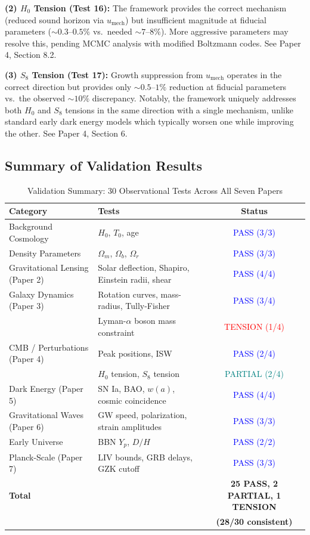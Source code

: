 \documentclass[11pt,a4paper]{article}
\newcommand{\umech}{\ensuremath{u_{\mathrm{mech}}}}
\theoremstyle{definition}
\theoremstyle{remark}
\begin{document}
\textbf{(2) $H_0$ Tension (Test 16):} The framework provides the correct mechanism (reduced sound horizon via $\umech$) but insufficient magnitude at fiducial parameters ($\sim 0.3$--$0.5\%$ vs.\ needed $\sim 7$--$8\%$). More aggressive parameters may resolve this, pending MCMC analysis with modified Boltzmann codes. See Paper 4, Section 8.2.

\textbf{(3) $S_8$ Tension (Test 17):} Growth suppression from $\umech$ operates in the correct direction but provides only $\sim 0.5$--$1\%$ reduction at fiducial parameters vs.\ the observed $\sim 10\%$ discrepancy. Notably, the framework uniquely addresses both $H_0$ and $S_8$ tensions in the same direction with a single mechanism, unlike standard early dark energy models which typically worsen one while improving the other. See Paper 4, Section 6.

\subsection{Summary of Validation Results}
\label{sec:validation_summary}

\begin{table}[H]
\centering
\caption{Validation Summary: 30 Observational Tests Across All Seven Papers}
\label{tab:validation_summary}
\begin{tabular}{@{}llc@{}}
\toprule
\textbf{Category} & \textbf{Tests} & \textbf{Status} \\
\midrule
Background Cosmology & $H_0$, $T_0$, age & \textcolor{blue}{PASS (3/3)} \\
Density Parameters & $\Omega_m$, $\Omega_b$, $\Omega_r$ & \textcolor{blue}{PASS (3/3)} \\
Gravitational Lensing (Paper 2) & Solar deflection, Shapiro, Einstein radii, shear & \textcolor{blue}{PASS (4/4)} \\
Galaxy Dynamics (Paper 3) & Rotation curves, mass-radius, Tully-Fisher & \textcolor{blue}{PASS (3/4)} \\
 & Lyman-$\alpha$ boson mass constraint & \textcolor{red}{TENSION (1/4)} \\
CMB / Perturbations (Paper 4) & Peak positions, ISW & \textcolor{blue}{PASS (2/4)} \\
 & $H_0$ tension, $S_8$ tension & \textcolor{teal}{PARTIAL (2/4)} \\
Dark Energy (Paper 5) & SN Ia, BAO, $w(a)$, cosmic coincidence & \textcolor{blue}{PASS (4/4)} \\
Gravitational Waves (Paper 6) & GW speed, polarization, strain amplitudes & \textcolor{blue}{PASS (3/3)} \\
Early Universe & BBN $Y_p$, $D/H$ & \textcolor{blue}{PASS (2/2)} \\
Planck-Scale (Paper 7) & LIV bounds, GRB delays, GZK cutoff & \textcolor{blue}{PASS (3/3)} \\
\midrule
\textbf{Total} & & \textbf{25 PASS, 2 PARTIAL, 1 TENSION} \\
 & & \textbf{(28/30 consistent)} \\
\bottomrule
\end{tabular}
\end{table}
\end{document}
